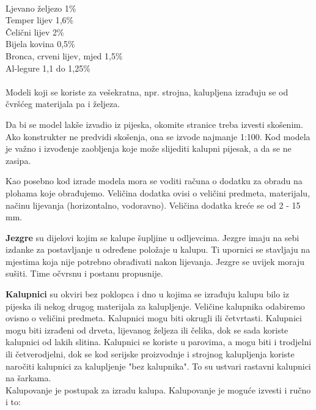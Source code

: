 \documentclass[a4paper,12pt]{article}
\numberwithin{figure}{section}
\begin{document}
\\
Ljevano željezo 1$\%$\\
Temper lijev 1,6$\%$\\
Čelični lijev 2$\%$\\
Bijela kovina 0,5$\%$\\
Bronca, crveni lijev, mjed 1,5$\%$\\
Al-legure 1,1 do 1,25$\%$\\
\\
Modeli koji se koriste za vešekratna, npr. strojna, kalupljena izrađuju se od čvršćeg materijala pa i željeza. \par
Da bi se model lakše izvadio iz pijeska, okomite stranice treba izvesti skošenim. Ako konstrukter ne predvidi skošenja, ona se izvode najmanje 1:100. Kod modela je važno i izvođenje zaobljenja koje može slijediti kalupni pijesak, a da se ne zasipa.\par
Kao posebno kod izrade modela mora se voditi računa o dodatku za obradu na plohama koje obrađujemo. Veličina dodatka ovisi o veličini predmeta, materijalu, načinu lijevanja (horizontalno, vodoravno). Veličina dodatka kreće se od 2 - 15 mm.\par
\textbf{Jezgre} su dijelovi kojim se kalupe šupljine u odljevcima. Jezgre imaju na sebi izdanke za postavljanje u određene položaje u kalupu. Ti upornici se stavljaju na mjestima koja nije potrebno obrađivati nakon lijevanja. Jezgre se uvijek moraju sušiti. Time očvrsnu i postanu propusnije.\par
\textbf{Kalupnici} su okviri bez poklopca i dno u kojima se izrađuju kalupu bilo iz pijeska ili nekog drugog materijala za kalupljenje. Veličine kalupnika odabiremo ovisno o veličini predmeta. Kalupnici mogu biti okrugli ili četvrtasti. Kalupnici mogu biti izrađeni od drveta, lijevanog željeza ili čelika, dok se sada koriste kalupnici od lakih slitina. Kalupnici se koriste u parovima, a mogu biti i trodjelni ili četverodjelni, dok se kod serijske proizvodnje i strojnog kalupljenja koriste naročiti kalupnici za kalupljenje "bez kalupnika". To su ustvari rastavni kalupnici na šarkama.\\
Kalupovanje je postupak za izradu kalupa. Kalupovanje je moguće izvesti i ručno i to:
\end{document}
